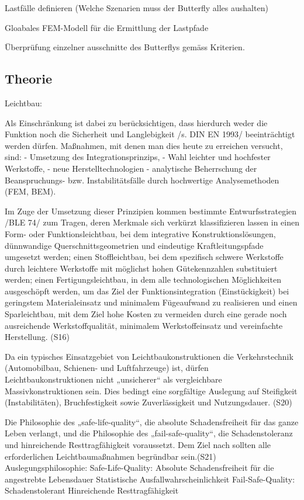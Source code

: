 Lastfälle definieren (Welche Szenarien muss der Butterfly alles aushalten)

Gloabales FEM-Modell für die Ermittlung der Lastpfade

Überprüfung einzelner ausschnitte des Butterflys gemäss Kriterien.




\subsection{Theorie}
Leichtbau:

Als Einschränkung ist dabei zu berücksichtigen, dass hierdurch weder die Funktion noch die Sicherheit und Langlebigkeit /s. DIN EN 1993/ beeinträchtigt werden dürfen. Maßnahmen, mit denen man dies heute zu erreichen versucht, sind:
- Umsetzung des Integrationsprinzips,
- Wahl leichter und hochfester Werkstoffe,
- neue Herstelltechnologien
- analytische Beherrschung der Beanspruchungs- bzw. Instabilitätsfälle durch hochwertige Analysemethoden (FEM, BEM).

Im Zuge der Umsetzung dieser Prinzipien kommen bestimmte Entwurfsstrategien /BLE 74/ zum Tragen, deren Merkmale sich verkürzt klassifizieren lassen in
  einen Form- oder Funktionsleichtbau, bei dem integrative Konstruktionslösungen, dünnwandige Querschnittsgeometrien und eindeutige Kraftleitungspfade umgesetzt werden;
  einen Stoffleichtbau, bei dem spezifisch schwere Werkstoffe durch leichtere Werkstoffe mit möglichst hohen Gütekennzahlen substituiert werden;
  einen Fertigungsleichtbau, in dem alle technologischen Möglichkeiten ausgeschöpft werden, um das Ziel der Funktionsintegration (Einstückigkeit) bei geringstem Materialeinsatz und minimalem Fügeaufwand zu realisieren
und
  einen Sparleichtbau, mit dem Ziel hohe Kosten zu vermeiden durch eine gerade noch ausreichende Werkstoffqualität, minimalem Werkstoffeinsatz und vereinfachte Herstellung.
(S16)

Da ein typisches Einsatzgebiet von Leichtbaukonstruktionen die Verkehrstechnik (Automobilbau, Schienen- und Luftfahrzeuge) ist, dürfen Leichtbaukonstruktionen nicht „unsicherer“ als vergleichbare Massivkonstruktionen sein. Dies bedingt eine sorgfältige Auslegung auf Steifigkeit (Instabilitäten), Bruchfestigkeit sowie Zuverlässigkeit und Nutzungsdauer. (S20)

Die Philosophie des „safe-life-quality“, die absolute Schadensfreiheit für das ganze Leben verlangt, und die Philosophie des „fail-safe-quality“, die Schadenstoleranz und hinreichende Resttragfähigkeit voraussetzt. Dem Ziel nach sollten alle erforderlichen Leichtbaumaßnahmen begründbar sein.(S21)
Auslegungsphilosophie:
  Safe-Life-Quality:
    Absolute Schadensfreiheit für die angestrebte Lebensdauer
    Statistische Ausfallwahrscheinlichkeit
  Fail-Safe-Quality:
    Schadenstolerant
    Hinreichende Resttragfähigkeit


